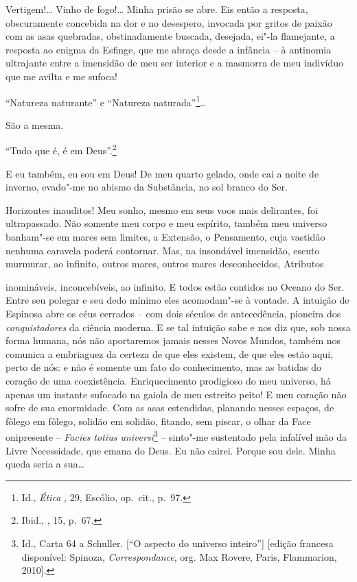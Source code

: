 Vertigem!\ldots{} Vinho de fogo!\ldots{} Minha prisão se abre. Eis então a
resposta, obscuramente concebida na dor e no desespero, invocada por
gritos de paixão com as asas quebradas, obstinadamente buscada,
desejada, ei"-la flamejante, a resposta ao enigma da Esfinge, que me
abraça desde a infância -- à antinomia ultrajante entre a imensidão de
meu ser interior e a masmorra de meu indivíduo que me avilta e me
sufoca!

``Natureza naturante'' e ``Natureza naturada''\footnote{Id.,
  \emph{Ética} , 29, Escólio, op.~cit., p.~97.}\ldots{}

São a mesma.

``Tudo que é, é em Deus''.\footnote{Ibid., , 15, p.~67.}

E eu também, eu sou em Deus! De meu quarto gelado, onde cai a noite de
inverno, evado"-me no abismo da Substância, no sol branco do Ser.

Horizontes inauditos! Meu sonho, mesmo em seus voos mais delirantes, foi
ultrapassado. Não somente meu corpo e meu espírito, também meu universo
banham"-se em mares sem limites, a Extensão, o Pensamento, cuja vastidão
nenhuma caravela poderá contornar. Mas, na insondável imensidão, escuto
murmurar, ao infinito, outros mares, outros mares desconhecidos,
Atributos \linebreak

\quebra

\noindent{}inomináveis, inconcebíveis, ao infinito. E todos estão
contidos no Oceano do Ser. Entre seu polegar e seu dedo mínimo eles
acomodam"-se à vontade. A intuição de Espinosa abre os céus cerrados --
com dois séculos de antecedência, pioneira dos \emph{conquistadores} da
ciência moderna. E se tal intuição sabe e nos diz que, sob nossa forma
humana, nós não aportaremos jamais nesses Novos Mundos, também nos
comunica a embriaguez da certeza de que eles existem, de que eles estão
aqui, perto de nós: e não é somente um fato do conhecimento, mas as
batidas do coração de uma coexistência. Enriquecimento prodigioso do meu
universo, há apenas um instante sufocado na gaiola de meu estreito
peito! E meu coração não sofre de sua enormidade. Com as asas
estendidas, planando nesses espaços, de fôlego em fôlego, solidão em
solidão, fitando, sem piscar, o olhar da Face onipresente --
\emph{Facies totius universi}\footnote{Id., Carta 64 a Schuller. {[}``O
  aspecto do universo inteiro''{]} {[}edição francesa disponível:
  Spinoza, \emph{Correspondance}, org. Max Rovere, Paris,  Flammarion,
  2010{]}.} -- sinto"-me sustentado pela infalível mão da Livre
Necessidade, que emana do Deus. Eu não cairei. Porque sou dele. Minha
queda seria a sua\ldots{}

